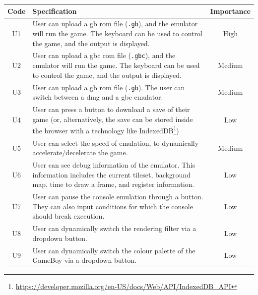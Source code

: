 \documentclass[11pt]{report}
\newcommand{\ftnt}[1]{\footnote{\url{#1}}}
\begin{document}
\begin{xltabular}{\textwidth}{|c|X|c|}
    \hline
    \textbf{Code} & \textbf{Specification} & \textbf{Importance}\\
    \hline\hline
    \endhead

    U1 & User can upload a \gls{gb} \gls{rom} file (\texttt{.gb}), and the emulator will run the game. The keyboard can be used to control the game, and the output is displayed. & High \\ \hline
    U2 & User can upload a \gls{gbc} \gls{rom} file (\texttt{.gbc}), and the emulator will run the game. The keyboard can be used to control the game, and the output is displayed. & Medium \\ \hline
    U3 & User can upload a \gls{gb} \gls{rom} file (\texttt{.gb}). The user can switch between a \gls{dmg} and a \gls{gbc} emulator. & Medium \\ \hline
    U4 & User can press a button to download a save of their game (or, alternatively, the save can be stored inside the browser with a technology like IndexedDB\ftnt{https://developer.mozilla.org/en-US/docs/Web/API/IndexedDB_API}) & Low \\ \hline
    U5 & User can select the speed of emulation, to dynamically accelerate/decelerate the game. & Medium \\ \hline
    U6 & User can see debug information of the emulator. This information includes the current tileset, background map, time to draw a frame, and register information. & Low \\ \hline
    U7 & User can pause the console emulation through a button. They can also input conditions for which the console should break execution. & Low \\ \hline
    U8 & User can dynamically switch the rendering filter via a dropdown button. & Low \\ \hline
    U9 & User can dynamically switch the colour palette of the GameBoy via a dropdown button. & Low \\ \hline


\end{xltabular}
\end{document}
